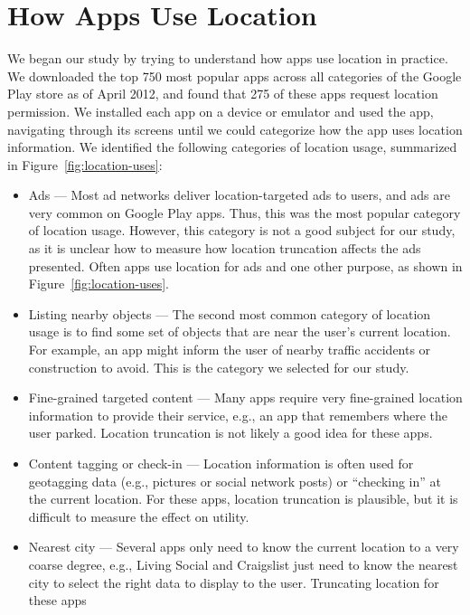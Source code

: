 \documentclass[10pt, conference, compsocconf]{IEEEtran}
\newcommand{\numinvestigatedapps}{750\xspace}
\newcommand{\numappsusinglocation}{275\xspace}
\begin{document}
\section{How Apps Use Location}
\label{sec:usage}

We began our study by trying to understand how apps use location in
practice. We downloaded the top \numinvestigatedapps most popular apps
across all categories of the Google Play store as of April 2012, and
found that \numappsusinglocation of these apps request location
permission.  We installed each app on a device or emulator and used
the app, navigating through its screens until we could categorize how
the app uses location information. We identified the following
categories of location usage, summarized in Figure~\ref{fig:location-uses}:

\begin{itemize}
\item Ads --- Most ad networks deliver location-targeted ads to
  users, and ads are very common on Google Play apps. Thus, this was
  the most popular category of location usage. However, this
  category is not a good subject for our study, as it is
  unclear how to measure how location truncation affects the ads
  presented. Often apps use location for ads and one other purpose, as
  shown in Figure~\ref{fig:location-uses}.
\item Listing nearby objects --- The second most common category of
  location usage is to find some set of objects that are near the
  user's current location. For example, an app might inform the user of
  nearby traffic accidents or construction to avoid. This is the
  category we selected for our study.
\item Fine-grained targeted content --- Many apps require
  very fine-grained location information to provide their service,
  e.g., an app that remembers where the user parked.
  Location truncation is not likely a good idea for these apps.
\item Content tagging or check-in --- Location information is often
  used for geotagging data (e.g., pictures
  or social network posts) or ``checking in'' at the current
  location. For these apps, location truncation is plausible, but
  it is difficult to measure the effect on utility.
\item Nearest city --- Several apps only need to know the current
  location to a very coarse degree, e.g., Living Social and
  Craigslist just need to know the nearest city to select the right
  data to display to the user. Truncating location for these apps

\end{itemize}
\end{document}
